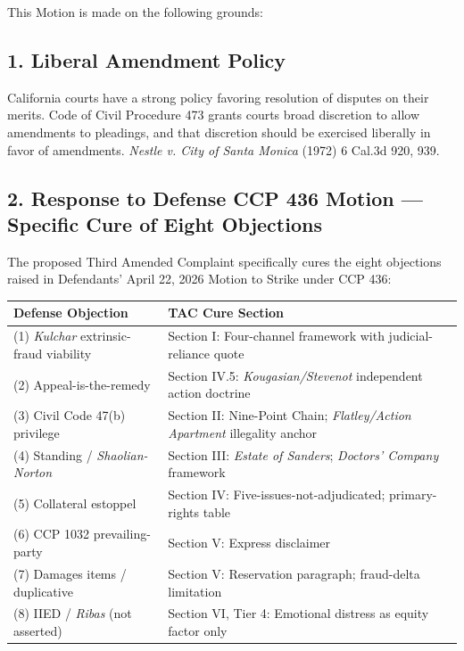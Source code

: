 This Motion is made on the following grounds:

\subsection{1. Liberal Amendment Policy}\label{liberal-amendment-policy}

California courts have a strong policy favoring resolution of disputes on their merits. Code of Civil Procedure \textsection{} 473 grants courts broad discretion to allow amendments to pleadings, and that discretion should be exercised liberally in favor of amendments. \emph{Nestle v. City of Santa Monica} (1972) 6 Cal.3d 920, 939.

\subsection{2. Response to Defense CCP \textsection{} 436 Motion --- Specific Cure of Eight Objections}\label{response-to-defense-ccp-436-motion-specific-cure-of-eight-objections}

The proposed Third Amended Complaint specifically cures the eight objections raised in Defendants' April 22, 2026 Motion to Strike under CCP \textsection{} 436:

{\def\LTcaptype{table} %
\begin{longtable}[]{@{}
  >{\raggedright\arraybackslash}p{}
  >{\raggedright\arraybackslash}p{}@{}}
\toprule\noalign{}
\begin{minipage}[b]{\linewidth}\raggedright
Defense Objection
\end{minipage} & \begin{minipage}[b]{\linewidth}\raggedright
TAC Cure Section
\end{minipage} \\
\midrule\noalign{}
\endhead
\bottomrule\noalign{}
\endlastfoot
(1) \emph{Kulchar} extrinsic-fraud viability & Section I: Four-channel framework with judicial-reliance quote \\
(2) Appeal-is-the-remedy & Section IV.5: \emph{Kougasian/Stevenot} independent action doctrine \\
(3) Civil Code \textsection{} 47(b) privilege & Section II: Nine-Point Chain; \emph{Flatley/Action Apartment} illegality anchor \\
(4) Standing / \emph{Shaolian-Norton} & Section III: \emph{Estate of Sanders}; \emph{Doctors' Company} framework \\
(5) Collateral estoppel & Section IV: Five-issues-not-adjudicated; primary-rights table \\
(6) CCP \textsection{} 1032 prevailing-party & Section V: Express disclaimer \\
(7) Damages items / duplicative & Section V: Reservation paragraph; fraud-delta limitation \\
(8) IIED / \emph{Ribas} (not asserted) & Section VI, Tier 4: Emotional distress as equity factor only \\
\end{longtable}
}

